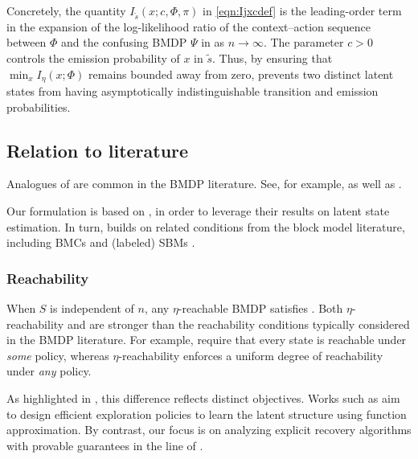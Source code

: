 \documentclass[11pt]{article}
\theoremstyle{definition}
\theoremstyle{definition}
\begin{document}
Concretely, the quantity $I_{\tilde{s}}(x;c,\Phi,\pi)$ in \eqref{eqn:Ijxcdef} is the leading-order term in the expansion of the log-likelihood ratio of the context--action sequence between $\Phi$ and the confusing \gls{BMDP} $\Psi$ in \cite[Appendix D]{Jedra:2022} as $n\rightarrow \infty$.
The parameter $c>0$ controls the emission probability of $x$ in $\tilde{s}$.
Thus, by ensuring that $\min_x I_{\eta}(x;\Phi)$ remains bounded away from zero,  prevents two distinct latent states from having asymptotically indistinguishable transition and emission probabilities.

\subsection{Relation to literature}

Analogues of  are common in the \gls{BMDP} literature.
See, for example, \cite[Definition 2.1 and/or Assumption 3.2]{pmlr-v97-du19b} as well as \cite[Definition 6]{pmlr-v119-misra20a}.

Our formulation is based on \cite{Jedra:2022}, in order to leverage their results on latent state estimation.
In turn, \cite{Jedra:2022} builds on related conditions from the block model literature, including \glspl{BMC} \cite{Sanders:2020} and (labeled) \glspl{SBM} \cite{abbe2018community,yun2016optimal,10.1214/17-AOS1615}.

\subsubsection{Reachability}

When $S$ is independent of $n$, any $\eta$-reachable \gls{BMDP} satisfies \cite[Assumptions 2 and 3]{Jedra:2022}.
Both $\eta$-reachability and \cite[Assumptions 2 and 3]{Jedra:2022} are stronger than the reachability conditions typically considered in the \gls{BMDP} literature.
For example, \cite{pmlr-v97-du19b,pmlr-v119-misra20a} require that every state is reachable under \emph{some} policy, whereas $\eta$-reachability enforces a uniform degree of reachability under \emph{any} policy.

As highlighted in , this difference reflects distinct objectives.
Works such as \cite{pmlr-v97-du19b,pmlr-v119-misra20a} aim to design efficient exploration policies to learn the latent structure using function approximation.
By contrast, our focus is on analyzing explicit recovery algorithms with provable guarantees in the line of \cite{Sanders:2020,Jedra:2022}.
\end{document}
